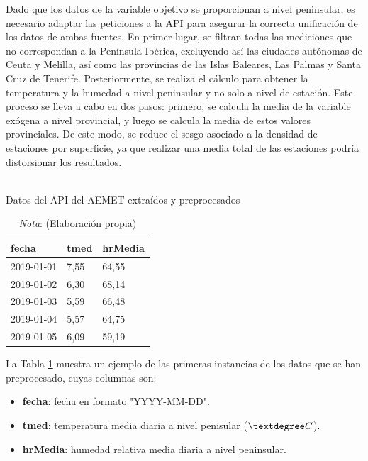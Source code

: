 \documentclass[12pt,a4paper]{report}
\begin{document}
Dado que los datos de la variable objetivo se proporcionan a nivel peninsular, es necesario adaptar las peticiones a la API para asegurar la correcta unificación de los datos de ambas fuentes. En primer lugar, se filtran todas las mediciones que no correspondan a la Península Ibérica, excluyendo así las ciudades autónomas de Ceuta y Melilla, así como las provincias de las Islas Baleares, Las Palmas y Santa Cruz de Tenerife. Posteriormente, se realiza el cálculo para obtener la temperatura y la humedad a nivel peninsular y no solo a nivel de estación. Este proceso se lleva a cabo en dos pasos: primero, se calcula la media de la variable exógena a nivel provincial, y luego se calcula la media de estos valores provinciales. De este modo, se reduce el sesgo asociado a la densidad de estaciones por superficie, ya que realizar una media total de las estaciones podría distorsionar los resultados.


\begin{table}[H]
\centering
\caption{\\ Datos del API del AEMET extraídos y preprocesados}
\renewcommand{\arraystretch}{1.1} %
\begin{tabular}{lll}
\toprule
\textbf{fecha} & \textbf{tmed} & \textbf{hrMedia} \\ \midrule
2019-01-01 & 7,55 & 64,55 \\ \hline
2019-01-02 & 6,30 & 68,14 \\ \hline
2019-01-03 & 5,59 & 66,48 \\ \hline
2019-01-04 & 5,57 & 64,75 \\ \hline
2019-01-05 & 6,09 & 59,19 \\ 
\bottomrule
\end{tabular}
\renewcommand{\arraystretch}{1} %
\label{tbl:datos_aemet}
\caption*{\textit{Nota}: (Elaboración propia)}
\end{table}


La Tabla \ref{tbl:datos_aemet} muestra un ejemplo de las primeras instancias de los datos que se han preprocesado, cuyas columnas son:

\begin{itemize}
    \item \textbf{fecha}: fecha en formato "YYYY-MM-DD".

    \item \textbf{tmed}: temperatura media diaria a nivel penisular ($\textdegree C$).

    \item \textbf{hrMedia}: humedad relativa media diaria a nivel peninsular.
\end{itemize}
\end{document}
